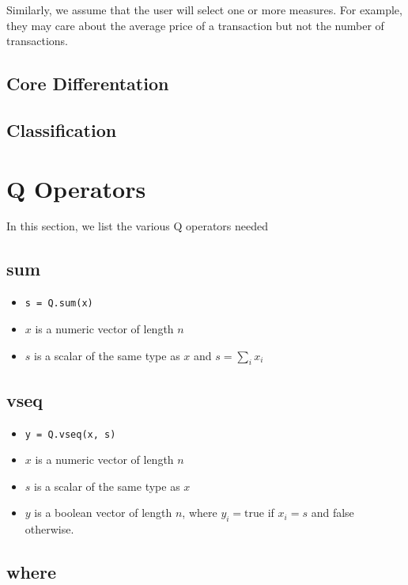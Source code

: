 Similarly, we assume that the user will select one or more measures. For
example, they may care about the average
price of a transaction but not the number of transactions.

\subsection{Core Differentation}
\label{Differentation}

\subsection{Classification}
\label{Classification}




\section{Q Operators}

In this section, we list the various Q operators needed

\subsection{sum}
\label{sum}

\begin{itemize}
\item \verb+s = Q.sum(x)+ 
\item \(x\) is a numeric vector of length \(n\)
\item \(s\) is a scalar of the same type as \(x\) and \(s = \sum_i x_i\)
\end{itemize}

\subsection{vseq}
\label{vseq}

\begin{itemize}
\item \verb+y = Q.vseq(x, s)+ 
\item \(x\) is a numeric vector of length \(n\)
\item \(s\) is a scalar of the same type as \(x\)
\item \(y\) is a boolean vector of length \(n\), where \(y_i = \mathrm{true}\)
if \(x_i = s\) and false otherwise.
\end{itemize}

\subsection{where}
\label{where}

